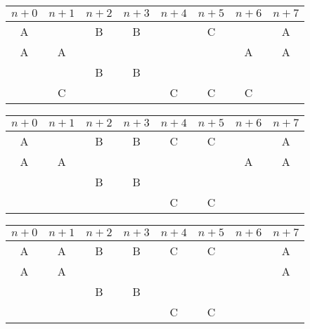 \documentclass[12pt]{article}
\begin{document}
\begin{center}
    \begin{tabular}{|c|c|c|c|c|c|c|c|}
        \hline
        $n+0$ & $n+1$ & $n+2$ & $n+3$ & $n+4$ & $n+5$ & $n+6$ & $n+7$ \\
        \hline
        \rowcolor[RGB]{200, 200, 200}
        A & & B &\cellcolor{gray!70} B & & C & & A \\
        \hline
        A & A &  &  &  &  & A & A \\
        \hline
         & \cellcolor{gray!15} & B & B &  & \cellcolor{gray!15} & \cellcolor{gray!15} &  \\
        \hline
         & C &  &  & C & C & C &  \\
        \hline
    \end{tabular}
\end{center}

\begin{center}
    \begin{tabular}{|c|c|c|c|c|c|c|c|}
        \hline
        $n+0$ & $n+1$ & $n+2$ & $n+3$ & $n+4$ & $n+5$ & $n+6$ & $n+7$ \\
        \hline
        \rowcolor[RGB]{200, 200, 200}
        A & & B & B &\cellcolor{gray!70} C & C & & A \\
        \hline
        A & A &  &  &  &  & A & A \\
        \hline
         &  & B & B &  &  &  &  \\
        \hline
         & \cellcolor{gray!15} & \cellcolor{gray!15} &  & C & C & \cellcolor{gray!15} & \cellcolor{gray!15} \\
        \hline
    \end{tabular}
\end{center}

\begin{center}
    \begin{tabular}{|c|c|c|c|c|c|c|c|}
        \hline
        $n+0$ & $n+1$ & $n+2$ & $n+3$ & $n+4$ & $n+5$ & $n+6$ & $n+7$ \\
        \hline
        \rowcolor[RGB]{200, 200, 200}
        A &\cellcolor{gray!70} A & B & B & C & C & & A \\
        \hline
        A & A &  & \cellcolor{gray!15} & \cellcolor{gray!15} &  & \cellcolor{gray!15} & A \\
        \hline
         &  & B & B &  &  &  &  \\
        \hline
         &  &  &  & C & C &  &  \\
        \hline
    \end{tabular}
\end{center}
\end{document}
